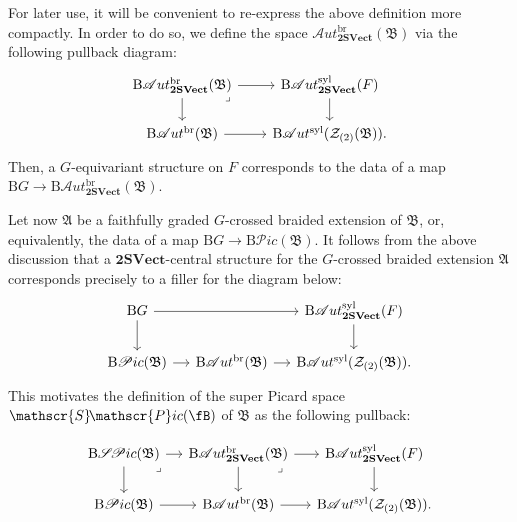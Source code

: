 \documentclass[11pt,reqno]{amsart}
\newcommand{\tSVect}{\mathbf{2SVect}}
\newcommand{\sPic}{\mathscr{P}ic}
\newcommand{\sAut}{\mathscr{A}ut}
\newcommand{\rB}{\mathrm{B}}
\numberwithin{equation}{section}
\theoremstyle{plain}
\theoremstyle{definition}
\begin{document}
For later use, it will be convenient to re-express the above definition more compactly. In order to do so, we define the space $\sAut^{\mathrm{br}}_{\mathbf{2SVect}}(\mathfrak{B})$ via the following pullback diagram:
$$\begin{tikzcd}[sep=tiny]
\arrow["\lrcorner"{anchor=center, pos=0.125}, draw=none, from=1-1, to=2-2]
\rB \sAut^{\mathrm{br}}_{\mathbf{2SVect}}(\mathfrak{B}) \arrow[rr]\arrow[dd]
& & \rB \mathscr{A}ut^{\mathrm{syl}}_{\tSVect
}(F) \arrow[dd]                     \\
& {} & \\
\rB \mathscr{A}ut^{\mathrm{br}}(\mathfrak{B}) \arrow[rr] & & \rB \mathscr{A}ut^{\mathrm{syl}}(\mathcal{Z}_{(2)}(\mathfrak{B})).
\end{tikzcd}$$
Then, a $G$-equivariant structure on $F$ corresponds to the data of a map $\rB G\rightarrow \rB\sAut^{\mathrm{br}}_{\mathbf{2SVect}}(\mathfrak{B})$.

Let now $\mathfrak{A}$ be a faithfully graded $G$-crossed braided extension of $\mathfrak{B}$, or, equivalently, the data of a map $\rB G\rightarrow \rB\sPic(\mathfrak{B})$. It follows from the above discussion that a $\mathbf{2SVect}$-central structure for the $G$-crossed braided extension $\mathfrak{A}$ corresponds precisely to a filler for the diagram below:
\begin{equation}
    \begin{tikzcd}[sep=small]
\rB G \arrow[dd] \arrow[rr] &                                            & \rB \mathscr{A}ut^{\mathrm{syl}}_{\tSVect
}(F) \arrow[dd]                     \\
& & \\
\rB \mathscr{P}ic(\mathfrak{B}) \arrow[r]                              & \rB \mathscr{A}ut^{\mathrm{br}}(\mathfrak{B}) \arrow[r] & \rB \mathscr{A}ut^{\mathrm{syl}}(\mathcal{Z}_{(2)}(\mathfrak{B})).
\end{tikzcd}
\end{equation}
This motivates the definition of the super Picard space $\mathscr{S}\!\mathscr{P}ic( \fB )$ of $\mathfrak{B}$ as the following pullback:

\begin{equation}\label{eq:enrichedPic}
\begin{tikzcd}[sep=small]
\arrow["\lrcorner"{anchor=center, pos=0.125}, draw=none, from=1-1, to=3-2]
\arrow["\lrcorner"{anchor=center, pos=0.125}, draw=none, from=1-2, to=3-3]
\rB \mathscr{S}\!\mathscr{P}ic(\mathfrak{B}) \arrow[dd] \arrow[r] &  \rB \sAut^{\mathrm{br}}_{\mathbf{2SVect}}(\mathfrak{B}) \arrow[r]\arrow[dd]
& \rB \mathscr{A}ut^{\mathrm{syl}}_{\tSVect
}(F) \arrow[dd]                     \\
& & \\
\rB \mathscr{P}ic(\mathfrak{B}) \arrow[r]                              & \rB \mathscr{A}ut^{\mathrm{br}}(\mathfrak{B}) \arrow[r] & \rB \mathscr{A}ut^{\mathrm{syl}}(\mathcal{Z}_{(2)}(\mathfrak{B})).
\end{tikzcd}
\end{equation}
\end{document}
